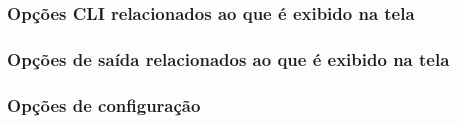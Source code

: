 \documentclass[letterpaper,10pt,brazil]{sphinxmanual}
\begin{document}
\subsubsection{Opções CLI relacionados ao que é exibido na tela}
\label{commandline/commandline-index:opcoes-cli-relacionados-ao-que-e-exibido-na-tela}
\begin{DUlineblock}{0em}
\item[] {\hyperref[commandline/commandline\string-all:mame\string-commandline\string-listmidi]{}}
\item[] {\hyperref[commandline/commandline\string-all:mame\string-commandline\string-listnetwork]{}}
\end{DUlineblock}


\subsubsection{Opções de saída relacionados ao que é exibido na tela}
\label{commandline/commandline-index:opcoes-de-saida-relacionados-ao-que-e-exibido-na-tela}
\begin{DUlineblock}{0em}
\item[] {\hyperref[commandline/commandline\string-all:mame\string-commandline\string-output]{}}
\end{DUlineblock}


\subsubsection{Opções de configuração}
\label{commandline/commandline-index:opcoes-de-configuracao}
\begin{DUlineblock}{0em}
\item[] {\hyperref[commandline/commandline\string-all:mame\string-commandline\string-noreadconfig]{}}
\end{DUlineblock}
\end{document}
